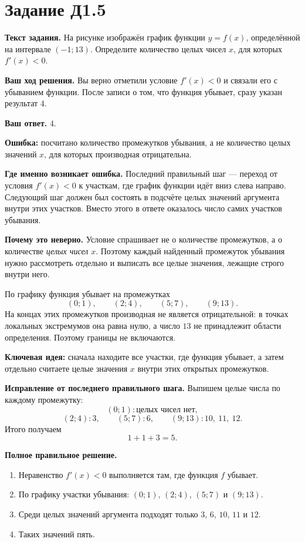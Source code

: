 \documentclass[a4paper,12pt]{article}
\newcommand{\errmark}{\textcolor{red!75!black}{\textbf{Ошибка:}}}
\newcommand{\ideamark}{\textcolor{accent}{\textbf{Ключевая идея:}}}
\begin{document}
\clearpage
{}\label{task:D1.5}
\section*{Задание Д1.5}

\textbf{Текст задания.}
На рисунке изображён график функции $y=f(x)$, определённой на интервале $(-1;13)$. Определите количество целых чисел $x$, для которых $f'(x)<0$.

\textbf{Ваш ход решения.}
Вы верно отметили условие $f'(x)<0$ и связали его с убыванием функции. После записи о том, что функция убывает, сразу указан результат $4$.

\textbf{Ваш ответ.} $4$.

\errmark{} посчитано количество промежутков убывания, а не количество целых значений $x$, для которых производная отрицательна.

\textbf{Где именно возникает ошибка.}
Последний правильный шаг --- переход от условия $f'(x)<0$ к участкам, где график функции идёт вниз слева направо. Следующий шаг должен был состоять в подсчёте целых значений аргумента внутри этих участков. Вместо этого в ответе оказалось число самих участков убывания.

\textbf{Почему это неверно.}
Условие спрашивает не о количестве промежутков, а о количестве \emph{целых чисел} $x$. Поэтому каждый найденный промежуток убывания нужно рассмотреть отдельно и выписать все целые значения, лежащие строго внутри него.

По графику функция убывает на промежутках
\[
(0;1),\qquad (2;4),\qquad (5;7),\qquad (9;13).
\]
На концах этих промежутков производная не является отрицательной: в точках локальных экстремумов она равна нулю, а число $13$ не принадлежит области определения. Поэтому границы не включаются.

\ideamark{} сначала находите все участки, где функция убывает, а затем отдельно считаете целые значения $x$ внутри этих открытых промежутков.

\textbf{Исправление от последнего правильного шага.}
Выпишем целые числа по каждому промежутку:
\[
(0;1)\colon \text{целых чисел нет},
\]
\[
(2;4)\colon 3,
\qquad
(5;7)\colon 6,
\qquad
(9;13)\colon 10,\ 11,\ 12.
\]
Итого получаем
\[
1+1+3=5.
\]

\textbf{Полное правильное решение.}
\begin{enumerate}
  \item Неравенство $f'(x)<0$ выполняется там, где функция $f$ убывает.
  \item По графику участки убывания: $(0;1)$, $(2;4)$, $(5;7)$ и $(9;13)$.
  \item Среди целых значений аргумента подходят только $3$, $6$, $10$, $11$ и $12$.
  \item Таких значений пять.
\end{enumerate}
\end{document}
